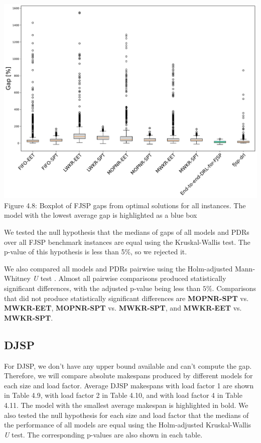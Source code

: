 \begin{center}
    \includegraphics[width=0.8\linewidth]{images/horizontal_boxplot_fjsp_all.pdf}\\
    Figure 4.8: Boxplot of FJSP gaps from optimal solutions for all instances. The model with the lowest average gap is highlighted as a blue box
\end{center}

We tested the null hypothesis that the medians of gaps of all models and PDRs over all FJSP benchmark instances are equal using the Kruskal-Wallis test. The p-value of this hypothesis is less than 5$\%$, so we rejected it. 
\par
We also compared all models and PDRs pairwise using the Holm-adjusted Mann-Whitney \textit{U} test \cite{mannwhitneyutest}. Almost all pairwise comparisons produced statistically significant differences, with the adjusted p-value being less than $5\%$. Comparisons that did not produce statistically significant differences are \textbf{MOPNR-SPT} vs. \textbf{MWKR-EET}, \textbf{MOPNR-SPT} vs. \textbf{MWKR-SPT}, and \textbf{MWKR-EET} vs. \textbf{MWKR-SPT}.

\subsection{DJSP}

For DJSP, we don't have any upper bound available and can't compute the gap. Therefore, we will compare absolute makespans produced by different models for each size and load factor. Average DJSP makespans with load factor 1 are shown in Table 4.9, with load factor 2 in Table 4.10, and with load factor 4 in Table 4.11. The model with the smallest average makespan is highlighted in bold. We also tested the null hypothesis for each size and load factor that the medians of the performance of all models are equal using the Holm-adjusted Kruskal-Wallis \textit{U} test. The corresponding p-values are also shown in each table.

